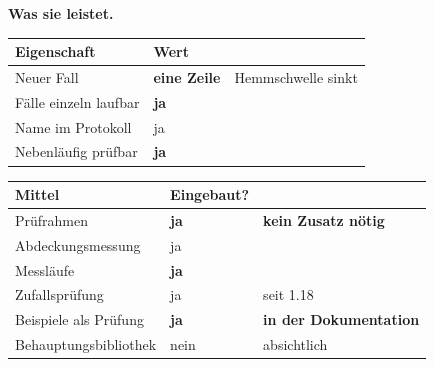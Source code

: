 \begin{merksatz}
\textbf{Was sie leistet.}

\begin{center}
\renewcommand{\arraystretch}{1.5}
\begin{tabular}{@{}P{3.0cm}P{2.2cm}P{2.6cm}@{}}
\toprule
\textbf{Eigenschaft} & \textbf{Wert} & \\
\midrule
Neuer Fall & \textbf{eine Zeile} & \textcolor{gruen}{Hemmschwelle sinkt}\\
Fälle einzeln laufbar & \textcolor{gruen}{\textbf{ja}} & \\
Name im Protokoll & \textcolor{gruen}{ja} & \\
Nebenläufig prüfbar & \textcolor{gruen}{\textbf{ja}} & \\
\bottomrule
\end{tabular}
\end{center}

\begin{center}
\end{center}

\begin{technik}
\begin{center}
{\small
\renewcommand{\arraystretch}{1.45}
\begin{tabular}{@{}P{3.0cm}P{2.4cm}P{2.6cm}@{}}
\toprule
\textbf{Mittel} & \textbf{Eingebaut?} & \\
\midrule
Prüfrahmen & \textcolor{gruen}{\textbf{ja}} & \textbf{kein Zusatz nötig}\\
Abdeckungs\-messung & \textcolor{gruen}{ja} & \\
Messläufe & \textcolor{gruen}{\textbf{ja}} & \\
Zufallsprüfung & \textcolor{gruen}{ja} & \textcolor{gruen}{seit 1.18}\\
Beispiele als Prüfung & \textcolor{gruen}{\textbf{ja}} & \textbf{in der Dokumentation}\\
Behauptungs\-bibliothek & \textcolor{akzent}{nein} & \textcolor{akzent}{absichtlich}\\
\bottomrule
\end{tabular}}
\end{center}

\begin{center}
\begin{minipage}{0.86\textwidth}
\end{minipage}
\end{center}


\end{technik}
\end{merksatz}
